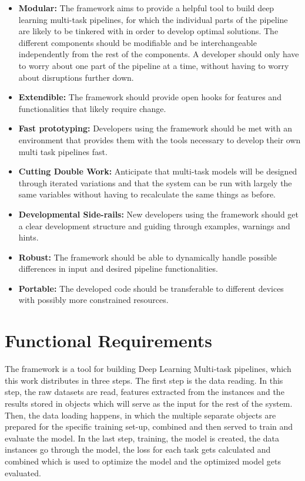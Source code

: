 \begin{itemize}
	\item \textbf{Modular:} The framework aims to provide a helpful tool to build deep learning multi-task pipelines, for which the individual parts of the pipeline are likely to be tinkered with in order to develop optimal solutions. The different components should be modifiable and be interchangeable independently from the rest of the components. A developer should only have to worry about one part of the pipeline at a time, without having to worry about disruptions further down.
	\item \textbf{Extendible:} The framework should provide open hooks for features and functionalities that likely require change. 
	\item \textbf{Fast prototyping:} Developers using the framework should be met with an environment that provides them with the tools necessary to develop their own multi task pipelines fast.
	\item \textbf{Cutting Double Work:} Anticipate that multi-task models will be designed through iterated variations and that the system can be run with largely the same variables without having to recalculate the same things as before.
	\item \textbf{Developmental Side-rails:} New developers using the framework should get a clear development structure and guiding through examples, warnings and hints.
	\item \textbf{Robust:} The framework should be able to dynamically handle possible differences in input and desired pipeline functionalities.
	\item \textbf{Portable:} The developed code should be transferable to different devices with possibly more constrained resources.
\end{itemize}

\section{Functional Requirements}

The framework is a tool for building Deep Learning Multi-task pipelines, which this work distributes in three steps. The first step is the data reading. In this step, the raw datasets are read, features extracted from the instances and the results stored in objects which will serve as the input for the rest of the system. Then, the data loading happens, in which the multiple separate objects are prepared for the specific training set-up, combined and then served to train and evaluate the model. In the last step, training, the model is created, the data instances go through the model, the loss for each task gets calculated and combined which is used to optimize the model and the optimized model gets evaluated. 

